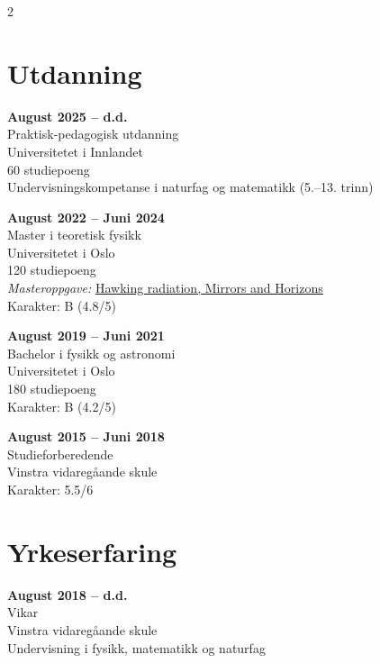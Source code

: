 \documentclass[a4paper,10pt]{article}
\begin{document}
\begin{paracol}{2}

\section*{Utdanning}

\textbf{August 2025 -- d.d.} \\
Praktisk-pedagogisk utdanning \\
Universitetet i Innlandet \\
60 studiepoeng \\
Undervisningskompetanse i naturfag og matematikk (5.--13. trinn)

\vspace{0.3cm}

\textbf{August 2022 -- Juni 2024} \\
Master i teoretisk fysikk \\
Universitetet i Oslo \\
120 studiepoeng\\
\textit{Masteroppgave:} \href{https://nva.sikt.no/registration/019c8fb09293-4e4c01e0-fe18-440c-b258-452000c9501c}{\underline{Hawking radiation, Mirrors and Horizons}}\\
Karakter: B (4.8/5)\\

\vspace{0.3cm}

\textbf{August 2019 -- Juni 2021} \\
Bachelor i fysikk og astronomi \\
Universitetet i Oslo \\
180 studiepoeng\\
Karakter: B (4.2/5)

\vspace{0.3cm}

\textbf{August 2015 -- Juni 2018} \\
Studieforberedende \\
Vinstra vidaregåande skule \\
Karakter: 5.5/6

\section*{Yrkeserfaring}

\textbf{August 2018 -- d.d.} \\
Vikar \\
Vinstra vidaregåande skule \\
Undervisning i fysikk, matematikk og naturfag


\end{paracol}
\end{document}
